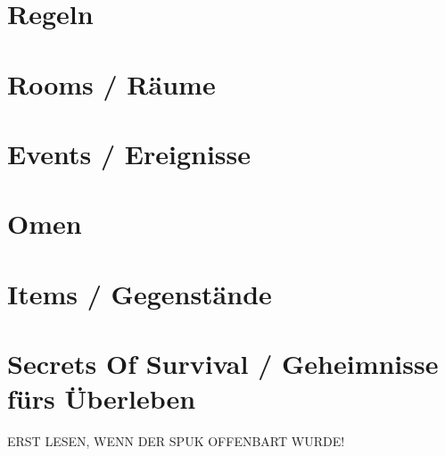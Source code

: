 \documentclass[11pt,a4paper,oneside,ngerman]{article}
\begin{document}


\tableofcontents


\pagebreak

\section{Regeln}
\setlength\parskip{7pt}

\setlength\parskip{0pt}

\pagebreak

\section{Rooms / Räume}



\twocolumn

\section{Events / Ereignisse}


\pagebreak

\section{Omen}


\pagebreak

\section{Items / Gegenstände}


\onecolumn



\onecolumn
\section{Secrets Of Survival / Geheimnisse fürs Überleben }
\label{kap:sos}
ERST LESEN, WENN DER SPUK OFFENBART WURDE!
\twocolumn
\end{document}
